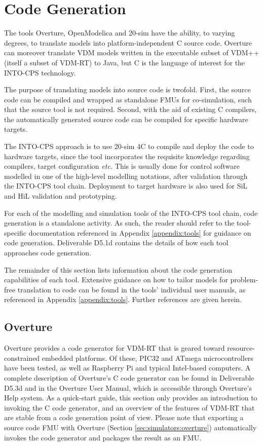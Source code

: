 \section{Code Generation}\label{sec:CodeGen}
The \into tools Overture, OpenModelica and {20-sim} have the ability, to varying degrees, to translate models into platform-independent C source code.
%
Overture can moreover translate VDM models written in the executable subset of VDM++ \cite{Lausdahl&11} (itself a subset of VDM-RT) to Java, but C is the language of interest for the INTO-CPS technology.

The purpose of translating models into source code is twofold.
%
First, the source code can be compiled and wrapped as standalone FMUs for co-simulation, such that the source tool is not required.
%
Second, with the aid of existing C compilers, the automatically generated source code can be compiled for specific hardware targets.

The INTO-CPS approach is to use {20-sim 4C} to compile and deploy the code to hardware targets, since the tool incorporates the requisite knowledge regarding compilers, target configuration \emph{etc.}
%
This is usually done for control software modelled in one of the high-level modelling notations, after validation through the INTO-CPS tool chain.
%
Deployment to target hardware is also used for SiL and HiL validation and prototyping.

For each of the modelling and simulation tools of the INTO-CPS tool chain, code generation is a standalone activity.
%
As such, the reader should refer to the tool-specific documentation referenced in Appendix \ref{appendix:tools} for guidance on code generation.
%
Deliverable D5.1d \cite{INTOCPSD51d} contains the details of how each tool approaches code generation.

The remainder of this section lists information about the code generation capabilities of each tool.
%
Extensive guidance on how to tailor models for problem-free translation to code can be found in the tools' individual user manuals, as referenced in Appendix \ref{appendix:tools}.
%
Further references are given herein.
%
%
%
\subsection{Overture}
Overture provides a code generator for VDM-RT that is geared toward resource-constrained embedded platforms.
%
Of these, PIC32 and ATmega microcontrollers have been tested, as well as Raspberry Pi and typical Intel-based computers.
%
A complete description of Overture's C code generator can be found in Deliverable D5.3d \cite{INTOCPSD5.3d} and in the Overture User Manual, which is accessible through Overture's Help system.
%
As a quick-start guide, this section only provides an introduction to invoking the C code generator, and an overview of the features of VDM-RT that are stable from a code generation point of view.
%
Please note that exporting a source code FMU with Overture (Section \ref{sec:simulators:overture}) automatically invokes the code generator and packages the result as an FMU.

